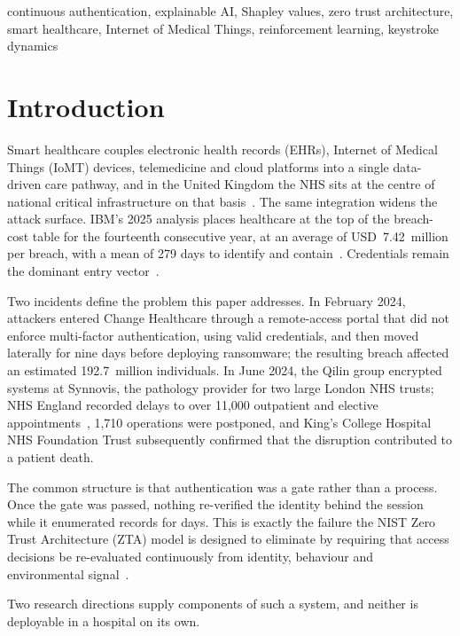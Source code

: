 \documentclass[conference]{IEEEtran}
\begin{document}
\begin{IEEEkeywords}
continuous authentication, explainable AI, Shapley values, zero trust
architecture, smart healthcare, Internet of Medical Things, reinforcement
learning, keystroke dynamics
\end{IEEEkeywords}

\section{Introduction}

Smart healthcare couples electronic health records (EHRs), Internet of Medical
Things (IoMT) devices, telemedicine and cloud platforms into a single
data-driven care pathway, and in the United Kingdom the NHS sits at the centre
of national critical infrastructure on that basis~\cite{nhsdspt}. The same
integration widens the attack surface. IBM's 2025 analysis places healthcare at
the top of the breach-cost table for the fourteenth consecutive year, at an
average of USD~7.42~million per breach, with a mean of 279 days to identify and
contain~\cite{ibm2025}. Credentials remain the dominant entry
vector~\cite{verizon2025}.

Two incidents define the problem this paper addresses. In February 2024,
attackers entered Change Healthcare through a remote-access portal that did not
enforce multi-factor authentication, using valid credentials, and then moved
laterally for nine days before deploying ransomware; the resulting breach
affected an estimated 192.7~million individuals. In June 2024, the Qilin group
encrypted systems at Synnovis, the pathology provider for two large London NHS
trusts; NHS England recorded delays to over 11,000 outpatient and elective
appointments~\cite{nhssynnovis}, 1,710 operations were postponed, and King's
College Hospital NHS Foundation Trust subsequently confirmed that the
disruption contributed to a patient death.

The common structure is that authentication was a gate rather than a process.
Once the gate was passed, nothing re-verified the identity behind the session
while it enumerated records for days. This is exactly the failure the NIST Zero
Trust Architecture (ZTA) model is designed to eliminate by requiring that
access decisions be re-evaluated continuously from identity, behaviour and
environmental signal~\cite{nist800207,syed2022}.

Two research directions supply components of such a system, and neither is
deployable in a hospital on its own.
\end{document}

